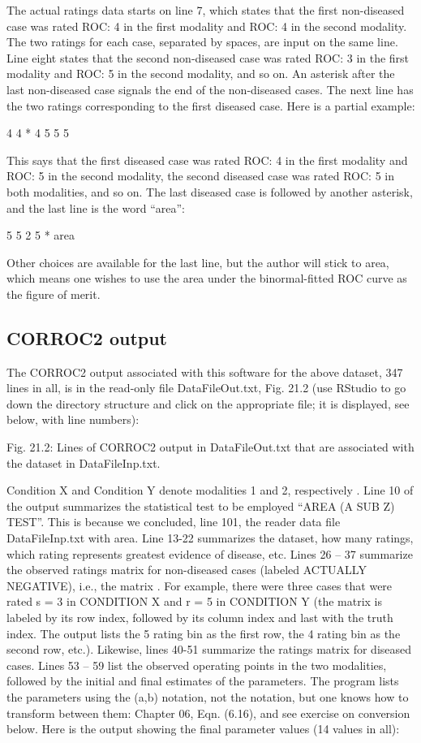\documentclass[
]{book}
\begin{document}
The actual ratings data starts on line 7, which states that the first non-diseased case was rated ROC: 4 in the first modality and ROC: 4 in the second modality. The two ratings for each case, separated by spaces, are input on the same line. Line eight states that the second non-diseased case was rated ROC: 3 in the first modality and ROC: 5 in the second modality, and so on. An asterisk after the last non-diseased case signals the end of the non-diseased cases. The next line has the two ratings corresponding to the first diseased case. Here is a partial example:

4 4
*
4 5
5 5

This says that the first diseased case was rated ROC: 4 in the first modality and ROC: 5 in the second modality, the second diseased case was rated ROC: 5 in both modalities, and so on. The last diseased case is followed by another asterisk, and the last line is the word ``area'':

5 5
2 5
*
area

Other choices are available for the last line, but the author will stick to area, which means one wishes to use the area under the binormal-fitted ROC curve as the figure of merit.

\hypertarget{bivariate-binormal-model-corroc2-output}{%
\subsection{CORROC2 output}\label{bivariate-binormal-model-corroc2-output}}

The CORROC2 output associated with this software for the above dataset, 347 lines in all, is in the read-only file DataFileOut.txt, Fig. 21.2 (use RStudio to go down the directory structure and click on the appropriate file; it is displayed, see below, with line numbers):

Fig. 21.2: Lines of CORROC2 output in DataFileOut.txt that are associated with the dataset in DataFileInp.txt.

Condition X and Condition Y denote modalities 1 and 2, respectively . Line 10 of the output summarizes the statistical test to be employed ``AREA (A SUB Z) TEST''. This is because we concluded, line 101, the reader data file DataFileInp.txt with area. Line 13-22 summarizes the dataset, how many ratings, which rating represents greatest evidence of disease, etc. Lines 26 -- 37 summarize the observed ratings matrix for non-diseased cases (labeled ACTUALLY NEGATIVE), i.e., the matrix . For example, there were three cases that were rated s = 3 in CONDITION X and r = 5 in CONDITION Y (the matrix is labeled by its row index, followed by its column index and last with the truth index. The output lists the 5 rating bin as the first row, the 4 rating bin as the second row, etc.). Likewise, lines 40-51 summarize the ratings matrix for diseased cases. Lines 53 -- 59 list the observed operating points in the two modalities, followed by the initial and final estimates of the parameters. The program lists the parameters using the (a,b) notation, not the notation, but one knows how to transform between them: Chapter 06, Eqn. (6.16), and see exercise on conversion below. Here is the output showing the final parameter values (14 values in all):
\end{document}
